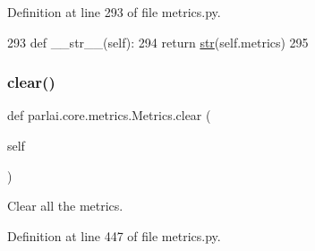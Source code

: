 Definition at line 293 of file metrics.\+py.


\begin{DoxyCode}
293     \textcolor{keyword}{def }\_\_str\_\_(self):
294         \textcolor{keywordflow}{return} \hyperlink{namespacegenerate__task__READMEs_a5b88452ffb87b78c8c85ececebafc09f}{str}(self.metrics)
295 
\end{DoxyCode}
\mbox{\label{classparlai_1_1core_1_1metrics_1_1Metrics_a72759455e9d5ebab2775aed1fa7f952a}} 
\subsubsection{\texorpdfstring{clear()}{clear()}}
{\footnotesize\ttfamily def parlai.\+core.\+metrics.\+Metrics.\+clear (\begin{DoxyParamCaption}\item[{}]{self }\end{DoxyParamCaption})}

\begin{DoxyVerb}Clear all the metrics.
\end{DoxyVerb}
 

Definition at line 447 of file metrics.\+py.


